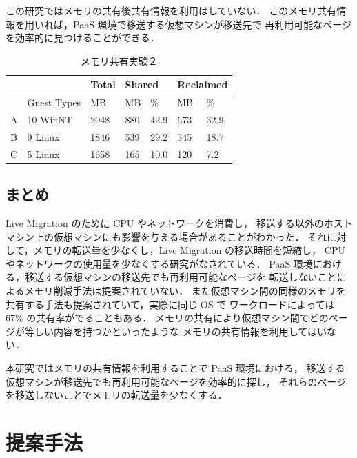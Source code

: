 \documentclass[graduation-thesis]{mlarticle}
\begin{document}
この研究ではメモリの共有後共有情報を利用はしていない．
このメモリ共有情報を用いれば，PaaS 環境で移送する仮想マシンが移送先で
再利用可能なページを効率的に見つけることができる．

\begin{table}[H]
\caption{メモリ共有実験２} \label{MRM_exp2}
\begin{center}
\begin{tabular}{|l|l|l|l|l|l|l|}
\hline
&               &  Total  &  \multicolumn{2}{|l|}{Shared}  &  \multicolumn{2}{|l|}{Reclaimed}  \\
\hline
&  Guest Types  &  MB     &  MB     &  \%                  &  MB     &  \%  \\
\hline
A  &  10 WinNT      & 2048    &  880    &  42.9                &  673    &  32.9    \\
\hline
B  &  9 Linux       & 1846    & 539     &  29.2                &  345    &  18.7    \\
\hline
C  &  5 Linux       & 1658    & 165     &  10.0                &  120    &   7.2   \\
\hline
\end{tabular}
\end{center}
\end{table}

\subsection{まとめ}
\label{sec-3-4}
Live Migration のために CPU やネットワークを消費し，
移送する以外のホストマシン上の仮想マシンにも影響を与える場合があることがわかった．
それに対して，メモリの転送量を少なくし，Live Migration の移送時間を短縮し，
CPU やネットワークの使用量を少なくする研究がなされている．
PaaS 環境における，移送する仮想マシンの移送先でも再利用可能なページを
転送しないことによるメモリ削減手法は提案されていない．
また仮想マシン間の同様のメモリを共有する手法も提案されていて，実際に同じ OS で
ワークロードによっては 67\% の共有率がでることもある．
メモリの共有により仮想マシン間でどのページが等しい内容を持つかといったような
メモリの共有情報を利用してはいない．

本研究ではメモリの共有情報を利用することで PaaS 環境における，
移送する仮想マシンが移送先でも再利用可能なページを効率的に探し，
それらのページを移送しないことでメモリの転送量を少なくする．

\clearpage

\section{提案手法}
\label{sec-4}
\end{document}
